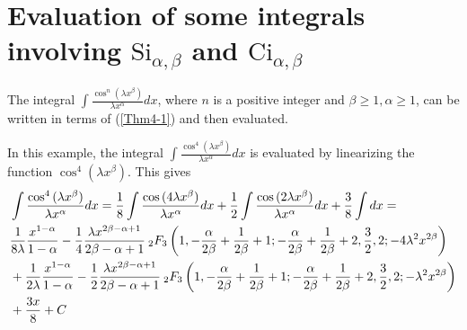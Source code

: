 \documentclass[smallextended]{svjour3}
\begin{document}
\section{Evaluation of some integrals involving $\text{Si}_{\alpha,\beta}$ and $\text{Ci}_{\alpha,\beta}$}\label{sine-cosine}
The integral $\int\frac{\cos^n{(\lambda x^\beta)}}{\lambda x^\alpha}dx$, where $n$ is a positive integer and $\beta\ge1,\alpha\ge1$, can be written in terms of (\ref{Thm4-1}) and then evaluated.
\begin{example}
In this example, the integral $\int\frac{\cos^4{(\lambda x^\beta)}}{\lambda x^\alpha}dx$ is evaluated by linearizing the function $\cos^4{(\lambda x^\beta)}$. This gives
\begin{align}
&\int\frac{\cos^4{(\lambda x^\beta)}}{\lambda x^\alpha}dx=\frac{1}{8}\int\frac{\cos{(4\lambda x^\beta)}}{\lambda x^\alpha}dx+\frac{1}{2}\int\frac{\cos{(2\lambda x^\beta)}}{\lambda x^\alpha}dx+\frac{3}{8}\int dx=
\nonumber\\ &\frac{1}{8\lambda}\frac{x^{1-\alpha}}{1-\alpha}-\frac{1}{4}\frac{\lambda x^{2\beta-\alpha+1}}{2\beta-\alpha+1}\hspace{.075cm} _{2}F_{3}\left(1,-\frac{\alpha}{2\beta}+\frac{1}{2\beta}+1;-\frac{\alpha}{2\beta}+\frac{1}{2\beta}+2,\frac{3}{2},2;-4\lambda^2 x^{2\beta}\right)
\nonumber\\ &+\frac{1}{2\lambda}\frac{x^{1-\alpha}}{1-\alpha}-\frac{1}{2}\frac{\lambda x^{2\beta-\alpha+1}}{2\beta-\alpha+1}\hspace{.075cm} _{2}F_{3}\left(1,-\frac{\alpha}{2\beta}+\frac{1}{2\beta}+1;-\frac{\alpha}{2\beta}+\frac{1}{2\beta}+2,\frac{3}{2},2;-\lambda^2 x^{2\beta}\right)\nonumber\\ &+\frac{3x}{8}+C
\end{align}
\label{ex2}
\end{example}
\end{document}
